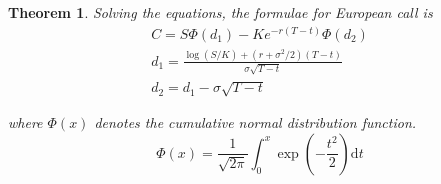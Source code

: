 \documentclass[12pt, oneside]{book}
\theoremstyle{plain}
\newtheorem{theorem}{Theorem}[section]
\theoremstyle{definition}
\begin{document}
\begin{theorem}\label{bsAnal} 
Solving the equations, the formulae \cite{wilmott} for European call is
\begin{eqnarray}
C = S \Phi (d_1) - K e^{-r(T-t)} \Phi (d_2) \\[10pt]
d_1 = \frac{\log(S/K) + (r + \sigma^2/2)(T - t)}{\sigma \sqrt{T-t}} \\[10pt]
d_2 = d_1 - \sigma \sqrt{T-t}
\end{eqnarray}

where $\Phi(x)$ denotes the cumulative normal distribution function.
\begin{equation}
\Phi(x) = \frac{1}{\sqrt{2 \pi}} \int_0^x \exp (-\frac{t^2}{2}) \mathrm{d}t
\end{equation}

\end{theorem}
\end{document}
